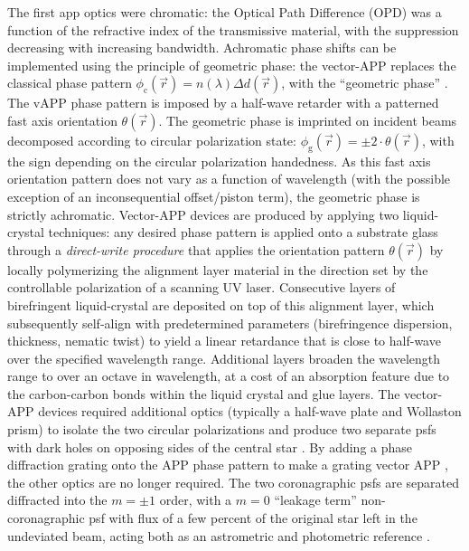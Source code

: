 \documentclass[letterpaper]{ar-1col}
\begin{document}
The first \ac{app} optics were chromatic: the Optical Path Difference (OPD) was a function of the refractive index of the transmissive material, with the suppression decreasing with increasing bandwidth.
%
Achromatic phase shifts can be implemented using the principle of geometric phase: the vector-APP \citep[vAPP; ][]{Snik12} replaces the classical phase pattern $\phi_{\textrm{c}}(\vec{r}) = n(\lambda) \Delta d(\vec{r})$,
with the ``geometric phase'' \citep[known as the Pancharatnam-Berry phase; ][]{Pancharatnam,Berry}.
%
The vAPP phase pattern is imposed by a half-wave retarder with a patterned fast axis orientation $\theta(\vec{r})$.
%
The geometric phase is imprinted on incident beams decomposed according to circular polarization state: $\phi_{\textrm{g}}(\vec{r}) = \pm2\cdot\theta(\vec{r})$, with the sign depending on the circular polarization handedness.
As this fast axis orientation pattern does not vary as a function of wavelength (with the possible exception of an inconsequential offset/piston term), the geometric phase is strictly achromatic.
%
Vector-APP devices are produced by applying two liquid-crystal techniques: any desired phase pattern is applied onto a substrate glass through a \textit{direct-write procedure} \citep{directwrite} that applies the orientation pattern $\theta(\vec{r})$ by locally polymerizing the alignment layer material in the direction set by the controllable polarization of a scanning UV laser.
%
Consecutive layers of birefringent liquid-crystal are deposited on top of this alignment layer, which subsequently self-align \citep[``\textit{Multi-Twist Retarders}''; MTR ][]{MTR} with predetermined parameters (birefringence dispersion, thickness, nematic twist) to yield a linear retardance that is close to half-wave over the specified wavelength range.
%
Additional layers broaden the wavelength range to over an octave in wavelength, at a cost of an absorption feature due to the carbon-carbon bonds within the liquid crystal and glue layers.
%
The vector-APP devices required additional optics (typically a half-wave plate and Wollaston prism) to isolate the two circular polarizations and produce two separate \acp{psf} with dark holes on opposing sides of the central star \citep{Snik12}.
%
By adding a phase diffraction grating onto the APP phase pattern to make a grating vector APP \citep[gvAPP; ][]{Snik12,Otten14}, the other optics are no longer required.
%
The two coronagraphic \acp{psf} are separated diffracted into the $m=\pm 1$ order, with a $m=0$ ``leakage term'' non-coronagraphic \ac{psf} with flux of a few percent of the original star left in the undeviated beam, acting both as an astrometric and photometric reference \citep{Otten17,Sutlieff24}.
\end{document}

